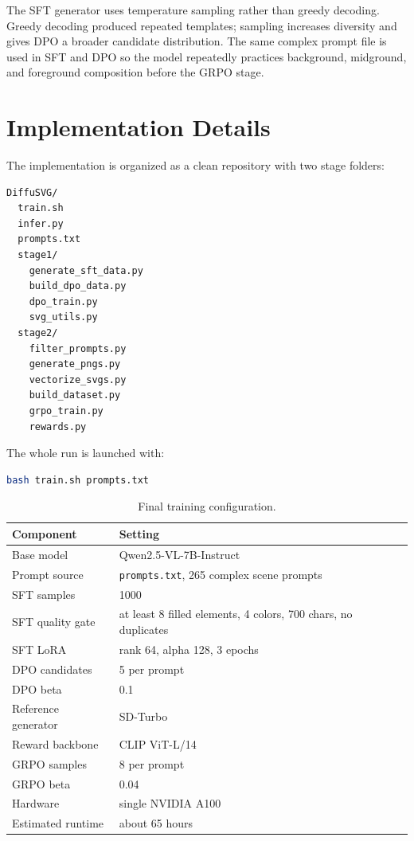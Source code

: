 \documentclass[10pt,twocolumn]{article}
\begin{document}
The SFT generator uses temperature sampling rather than greedy decoding. Greedy
decoding produced repeated templates; sampling increases diversity and gives
DPO a broader candidate distribution. The same complex prompt file is used in
SFT and DPO so the model repeatedly practices background, midground, and
foreground composition before the GRPO stage.

\section{Implementation Details}

The implementation is organized as a clean repository with two stage folders:

\begin{lstlisting}[language=bash]
DiffuSVG/
  train.sh
  infer.py
  prompts.txt
  stage1/
    generate_sft_data.py
    build_dpo_data.py
    dpo_train.py
    svg_utils.py
  stage2/
    filter_prompts.py
    generate_pngs.py
    vectorize_svgs.py
    build_dataset.py
    grpo_train.py
    rewards.py
\end{lstlisting}

The whole run is launched with:

\begin{lstlisting}[language=bash]
bash train.sh prompts.txt
\end{lstlisting}

\begin{table}[t]
\centering
\caption{Final training configuration.}
\label{tab:hparams}
\begin{tabularx}{\linewidth}{@{}lX@{}}
\toprule
\textbf{Component} & \textbf{Setting} \\
\midrule
Base model & Qwen2.5-VL-7B-Instruct \\
Prompt source & \texttt{prompts.txt}, 265 complex scene prompts \\
SFT samples & 1000 \\
SFT quality gate & at least 8 filled elements, 4 colors, 700 chars, no duplicates \\
SFT LoRA & rank 64, alpha 128, 3 epochs \\
DPO candidates & 5 per prompt \\
DPO beta & 0.1 \\
Reference generator & SD-Turbo \\
Reward backbone & CLIP ViT-L/14 \\
GRPO samples & 8 per prompt \\
GRPO beta & 0.04 \\
Hardware & single NVIDIA A100 \\
Estimated runtime & about 65 hours \\
\bottomrule
\end{tabularx}
\end{table}
\end{document}

